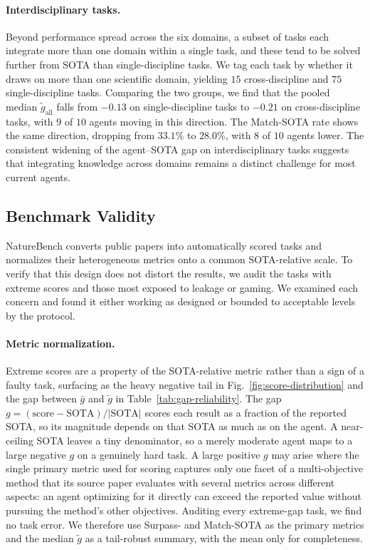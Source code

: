 \paragraph{Interdisciplinary tasks.}
Beyond performance spread across the six domains, a subset of tasks each integrate more than one domain within a single task, and these tend to be solved further from SOTA than single-discipline tasks. We tag each task by whether it draws on more than one scientific domain, yielding $15$ cross-discipline and $75$ single-discipline tasks. Comparing the two groups, we find that the pooled median $\tilde{g}_{\text{all}}$ falls from $-0.13$ on single-discipline tasks to $-0.21$ on cross-discipline tasks, with $9$ of $10$ agents moving in this direction. The Match-SOTA rate shows the same direction, dropping from $33.1\%$ to $28.0\%$, with $8$ of $10$ agents lower. The consistent widening of the agent--SOTA gap on interdisciplinary tasks suggests that integrating knowledge across domains remains a distinct challenge for most current agents.


\subsection{Benchmark Validity}
\label{sec:exp:validity}

NatureBench converts public papers into automatically scored tasks and normalizes their heterogeneous metrics onto a common SOTA-relative scale. To verify that this design does not distort the results, we audit the tasks with extreme scores and those most exposed to leakage or gaming. We examined each concern and found it either working as designed or bounded to acceptable levels by the protocol.

\paragraph{Metric normalization.}
Extreme scores are a property of the SOTA-relative metric rather than a sign of a faulty task, surfacing as the heavy negative tail in Fig.~\ref{fig:score-distribution} and the gap between $\bar{g}$ and $\tilde{g}$ in Table~\ref{tab:gap-reliability}. The gap $g=(\text{score}-\text{SOTA})/|\text{SOTA}|$ scores each result as a fraction of the reported SOTA, so its magnitude depends on that SOTA as much as on the agent. A near-ceiling SOTA leaves a tiny denominator, so a merely moderate agent maps to a large negative $g$ on a genuinely hard task. A large positive $g$ may arise where the single primary metric used for scoring captures only one facet of a multi-objective method that its source paper evaluates with several metrics across different aspects: an agent optimizing for it directly can exceed the reported value without pursuing the method's other objectives. Auditing every extreme-gap task, we find no task error. We therefore use Surpass- and Match-SOTA as the primary metrics and the median $\tilde{g}$ as a tail-robust summary, with the mean only for completeness.

